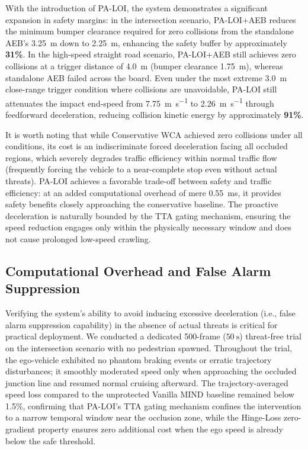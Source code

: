 \documentclass[conference]{IEEEtran}
\begin{document}
With the introduction of PA-LOI, the system demonstrates a significant expansion in safety margins: in the intersection scenario, PA-LOI+AEB reduces the minimum bumper clearance required for zero collisions from the standalone AEB's \SI{3.25}{\meter} down to \SI{2.25}{\meter}, enhancing the safety buffer by approximately \textbf{31\%}. In the high-speed straight road scenario, PA-LOI+AEB still achieves zero collisions at a trigger distance of \SI{4.0}{\meter} (bumper clearance \SI{1.75}{\meter}), whereas standalone AEB failed across the board. Even under the most extreme \SI{3.0}{\meter} close-range trigger condition where collisions are unavoidable, PA-LOI still attenuates the impact end-speed from \SI{7.75}{\meter\per\second} to \SI{2.26}{\meter\per\second} through feedforward deceleration, reducing collision kinetic energy by approximately \textbf{91\%}.

It is worth noting that while Conservative WCA achieved zero collisions under all conditions, its cost is an indiscriminate forced deceleration facing all occluded regions, which severely degrades traffic efficiency within normal traffic flow (frequently forcing the vehicle to a near-complete stop even without actual threats). PA-LOI achieves a favorable trade-off between safety and traffic efficiency: at an added computational overhead of mere \SI{0.55}{\milli\second}, it provides safety benefits closely approaching the conservative baseline. The proactive deceleration is naturally bounded by the TTA gating mechanism, ensuring the speed reduction engages only within the physically necessary window and does not cause prolonged low-speed crawling.

\subsection{Computational Overhead and False Alarm Suppression}
Verifying the system's ability to avoid inducing excessive deceleration (i.e., false alarm suppression capability) in the absence of actual threats is critical for practical deployment. We conducted a dedicated 500-frame ($\SI{50}{\second}$) threat-free trial on the intersection scenario with no pedestrian spawned. Throughout the trial, the ego-vehicle exhibited no phantom braking events or erratic trajectory disturbances; it smoothly moderated speed only when approaching the occluded junction line and resumed normal cruising afterward. The trajectory-averaged speed loss compared to the unprotected Vanilla MIND baseline remained below 1.5\%, confirming that PA-LOI's TTA gating mechanism confines the intervention to a narrow temporal window near the occlusion zone, while the Hinge-Loss zero-gradient property ensures zero additional cost when the ego speed is already below the safe threshold.
\end{document}
